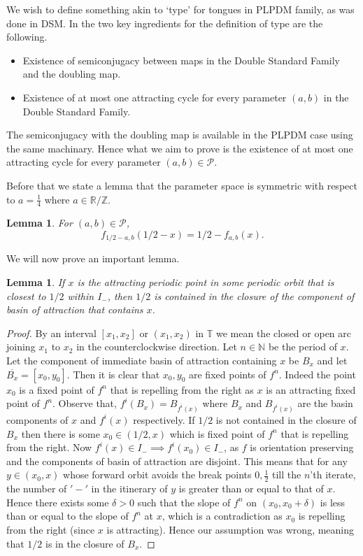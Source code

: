 \documentclass[12pt]{amsart}
\numberwithin{equation}{section}
\newtheorem{lemma}[theorem]{Lemma}
\theoremstyle{remark}
\begin{document}
We wish to define something akin to `type' for tongues  in PLPDM family, as was done in DSM. In \cite{MR} the two key ingredients for the definition of type are the following.
\begin{itemize}
    \item Existence of semiconjugacy between maps in the Double Standard Family and the doubling map.
    \item  Existence of at most one attracting cycle for every parameter $(a,b) $ in the Double Standard Family.
\end{itemize}
  The semiconjugacy with the doubling map is available in the PLPDM case using the same machinary. Hence what we aim to prove is the existence of at most one attracting cycle for every parameter $(a,b) \in \mathcal P$.

Before that we state a lemma that the parameter space is symmetric with respect to $a=\frac{1}{4}$ where $a \in \mathbb{R}/\mathbb{Z}$. 
\begin{lemma} 
For $(a,b)\in \mathcal{P}$,
\[
    f_{1/2-a,b}(1/2-x) = 1/2 - f_{a,b}(x).
\]
\end{lemma}

 We will now prove an important lemma.
\begin{lemma}\label{0.5 in closure}
If $x$ is the attracting periodic point in some periodic orbit that is closest to $1/2$ within $I_-$, then $1/2$ is contained in the closure of the component of basin of attraction that contains $x$.
\end{lemma}
 \begin{proof}
By an interval $[x_1,x_2]$ or $(x_1, x_2)$ in $\mathbb{T}$ we mean the closed or open arc joining $x_1$ to $x_2$ in the counterclockwise direction. Let $n \in \mathbb{N}$ be the  period of $x$. Let the component of immediate basin of attraction containing $x$ be $B_x$ and let $\overline{B_x}=[x_0,y_0]$. Then it is clear that $x_0,y_0$ are fixed points of $f^n$. Indeed the point $x_0$ is a fixed point of $f^n$ that is repelling from the right as $x$ is an attracting fixed point of $f^n$. Observe that, $f^i(B_x)=B_{f^i(x)}$ where $B_x$ and $B_{f^i(x)}$ are the basin components of $x$ and $f^i(x)$ respectively. 
If $1/2$ is not contained in the closure of $B_x$ then there is some $x_0 \in (1/2,x)$ which is  fixed point of $f^n$ that is repelling from the right. Now
$f^i(x) \in I_{-} \implies f^i(x_0) \in I_{-}$, as $f$ is orientation preserving and the components of basin of attraction are disjoint. 
This means that for any $y \in (x_0,x)$  whose forward orbit avoids the break points $0,\frac{1}{2}$ till the $n$'th iterate, the number of $'-'$ in the itinerary of $y$ is greater than or equal to that of $x$. Hence there exists some $\delta>0$ such that the slope of $f^n$ on $(x_0,x_0+\delta)$ is less than or equal to the slope of $f^n$ at $x$, which is a contradiction as $x_0$ is  repelling from the right (since $x$ is attracting). Hence our assumption was wrong, meaning that $1/2$ is in the closure of $B_x$. 
    \end{proof}
\end{document}
